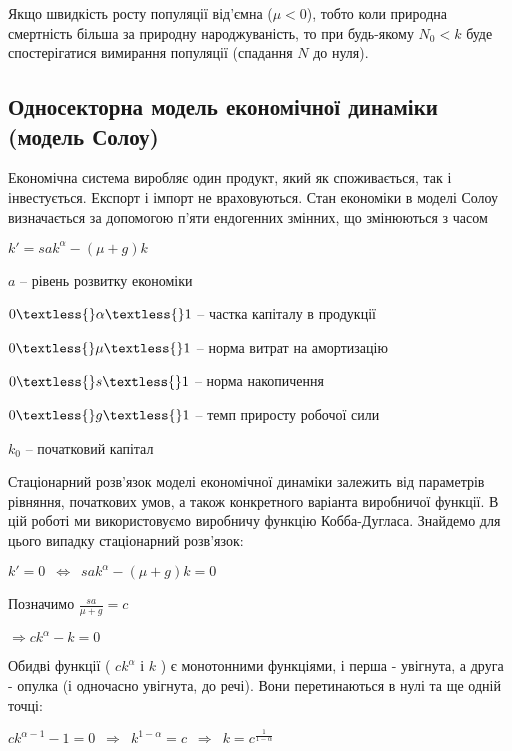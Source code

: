 \documentclass[11pt]{article}
\begin{document}
    Якщо швидкість росту популяції від'ємна (\(\mu < 0\)), тобто коли
природна смертність більша за природну народжуваність, то при будь-якому
\(N_0 < k\) буде спостерігатися вимирання популяції (спадання \(N\) до
нуля).

    \subsection{Односекторна модель економічної динаміки (модель
Солоу)}\label{ux43eux434ux43dux43eux441ux435ux43aux442ux43eux440ux43dux430-ux43cux43eux434ux435ux43bux44c-ux435ux43aux43eux43dux43eux43cux456ux447ux43dux43eux457-ux434ux438ux43dux430ux43cux456ux43aux438-ux43cux43eux434ux435ux43bux44c-ux441ux43eux43bux43eux443}

    Економічна система виробляє один продукт, який як споживається, так і
інвестується. Експорт і імпорт не враховуються. Стан економіки в моделі
Солоу визначається за допомогою п'яти ендогенних змінних, що змінюються
з часом

$ k'=sak^\alpha-(\mu+g)k $

$ a $ -- рівень розвитку економіки

$ 0 \textless{} \alpha \textless{} 1 $ -- частка капіталу в продукції

$ 0 \textless{} \mu \textless{} 1 $ -- норма витрат на амортизацію

$ 0 \textless{} s \textless{} 1 $ -- норма накопичення

$ 0 \textless{} g \textless{} 1 $ -- темп приросту робочої сили

$ k_0 $ -- початковий капітал

    Стаціонарний розв'язок моделі економічної динаміки залежить від
параметрів рівняння, початкових умов, а також конкретного варіанта
виробничої функції. В цій роботі ми використовуємо виробничу функцію
Кобба-Дугласа. Знайдемо для цього випадку стаціонарний розв'язок:

$ k'= 0 \enspace \Leftrightarrow \enspace sak^\alpha-(\mu+g)k = 0 $

Позначимо \(\frac{sa}{\mu+g} = c\)

$ \Rightarrow ck^\alpha-k = 0 $

Обидві функції ( $ ck^\alpha $ і $ k $ ) є монотонними функціями,
і перша - увігнута, а друга - опулка (і одночасно увігнута, до речі).
Вони перетинаються в нулі та ще одній точці:

$ ck^{\alpha-1}-1 = 0
\enspace \Rightarrow \enspace k^{1-\alpha} = c
\enspace \Rightarrow \enspace k = c^{\frac{1}{1-\alpha}} $
\end{document}
